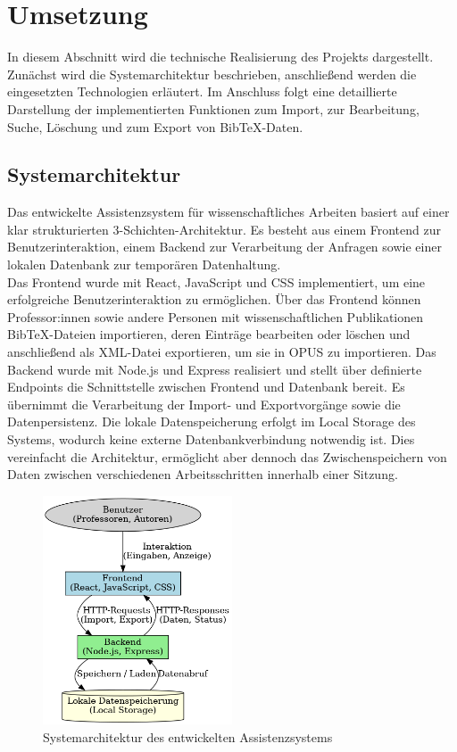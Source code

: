 \chapter{Umsetzung}
In diesem Abschnitt wird die technische Realisierung des Projekts dargestellt. 
Zunächst wird die Systemarchitektur beschrieben, anschließend werden die 
eingesetzten Technologien erläutert. Im Anschluss folgt eine detaillierte 
Darstellung der implementierten Funktionen zum Import, zur Bearbeitung, 
Suche, Löschung und zum Export von Bib\TeX{}-Daten.

\section{Systemarchitektur}
Das entwickelte Assistenzsystem für wissenschaftliches Arbeiten basiert auf einer klar strukturierten 3-Schichten-Architektur. 
Es besteht aus einem Frontend zur Benutzerinteraktion, einem Backend zur Verarbeitung der Anfragen sowie einer lokalen Datenbank 
zur temporären Datenhaltung.\\

\noindent Das Frontend wurde mit React, JavaScript und CSS implementiert, um eine erfolgreiche Benutzerinteraktion zu ermöglichen. 
Über das Frontend können Professor:innen sowie andere Personen mit wissenschaftlichen Publikationen BibTeX-Dateien importieren, 
deren Einträge bearbeiten oder löschen und anschließend als XML-Datei exportieren, um sie in OPUS zu importieren. Das Backend 
wurde mit Node.js und Express realisiert und stellt über definierte Endpoints die Schnittstelle zwischen Frontend und Datenbank 
bereit. Es übernimmt die Verarbeitung der Import- und Exportvorgänge sowie die Datenpersistenz. Die lokale Datenspeicherung 
erfolgt im Local Storage des Systems, wodurch keine externe Datenbankverbindung notwendig ist. Dies vereinfacht die Architektur, 
ermöglicht aber dennoch das Zwischenspeichern von Daten zwischen verschiedenen Arbeitsschritten innerhalb einer Sitzung.

\begin{figure}[h]
    \centering
    \includegraphics[width=0.5\textwidth]{Graphics/systemarchitektur_diagramm.png}
    \caption{Systemarchitektur des entwickelten Assistenzsystems}
    \label{fig:systemarchitektur}
\end{figure}

